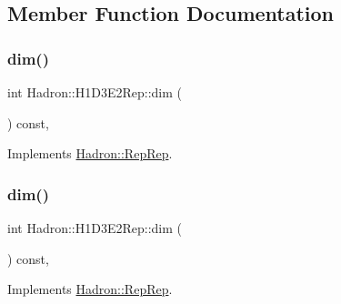 \subsection{Member Function Documentation}
\mbox{\label{structHadron_1_1H1D3E2Rep_ac3d25d7b7ce1156c787d549f631689e8}} 
\subsubsection{\texorpdfstring{dim()}{dim()}\hspace{0.1cm}{\footnotesize\ttfamily [1/5]}}
{\footnotesize\ttfamily int Hadron\+::\+H1\+D3\+E2\+Rep\+::dim (\begin{DoxyParamCaption}{ }\end{DoxyParamCaption}) const\hspace{0.3cm}{\ttfamily [inline]}, {\ttfamily [virtual]}}



Implements \mbox{\hyperlink{structHadron_1_1RepRep_a92c8802e5ed7afd7da43ccfd5b7cd92b}{Hadron\+::\+Rep\+Rep}}.

\mbox{\label{structHadron_1_1H1D3E2Rep_ac3d25d7b7ce1156c787d549f631689e8}} 
\subsubsection{\texorpdfstring{dim()}{dim()}\hspace{0.1cm}{\footnotesize\ttfamily [2/5]}}
{\footnotesize\ttfamily int Hadron\+::\+H1\+D3\+E2\+Rep\+::dim (\begin{DoxyParamCaption}{ }\end{DoxyParamCaption}) const\hspace{0.3cm}{\ttfamily [inline]}, {\ttfamily [virtual]}}



Implements \mbox{\hyperlink{structHadron_1_1RepRep_a92c8802e5ed7afd7da43ccfd5b7cd92b}{Hadron\+::\+Rep\+Rep}}.

\mbox{\label{structHadron_1_1H1D3E2Rep_ac3d25d7b7ce1156c787d549f631689e8}} 
